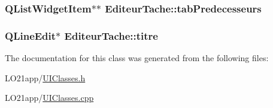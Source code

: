 \subsubsection[{tab\+Predecesseurs}]{\setlength{\rightskip}{0pt plus 5cm}Q\+List\+Widget\+Item$\ast$$\ast$ Editeur\+Tache\+::tab\+Predecesseurs}\label{class_editeur_tache_ac5571067515d4f44d85d206b4e68ffc2}
\hypertarget{class_editeur_tache_a188e190433234ece59f36b9f633013da}{}
\subsubsection[{titre}]{\setlength{\rightskip}{0pt plus 5cm}Q\+Line\+Edit$\ast$ Editeur\+Tache\+::titre}\label{class_editeur_tache_a188e190433234ece59f36b9f633013da}


The documentation for this class was generated from the following files\+:\begin{DoxyCompactItemize}
\item 
L\+O21app/\hyperlink{_u_i_classes_8h}{U\+I\+Classes.\+h}\item 
L\+O21app/\hyperlink{_u_i_classes_8cpp}{U\+I\+Classes.\+cpp}\end{DoxyCompactItemize}
